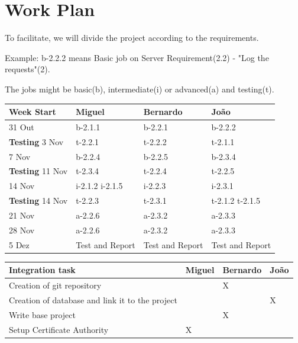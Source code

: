 \documentclass[a4paper,titlepage,11pt]{article}
\begin{document}
\section{Work Plan}
To facilitate, we will divide the project according to the requirements.

Example: b-2.2.2 means Basic job on Server Requirement(2.2) - "Log the requests"(2).

The jobs might be basic(b), intermediate(i) or advanced(a) and testing(t).
\begin{center}
    \begin{tabular}{| l || l | l | l |}
    \hline
    \textbf{Week Start} & \textbf{Miguel} & \textbf{Bernardo} & \textbf{João} \\ \hline \hline
    31 Out & b-2.1.1 & b-2.2.1 & b-2.2.2 \\
    \textbf{Testing} 3 Nov& t-2.2.1 & t-2.2.2 & t-2.1.1 \\ \hline
    7 Nov & b-2.2.4 & b-2.2.5 & b-2.3.4 \\
    \textbf{Testing} 11 Nov & t-2.3.4 & t-2.2.4 & t-2.2.5 \\ \hline
    14 Nov & i-2.1.2 i-2.1.5 & i-2.2.3 & i-2.3.1 \\
    \textbf{Testing} 14 Nov & t-2.2.3 & t-2.3.1 & t-2.1.2 t-2.1.5 \\ \hline
    21 Nov & a-2.2.6 & a-2.3.2 & a-2.3.3 \\
    28 Nov & a-2.2.6 & a-2.3.2 & a-2.3.3 \\
    5 Dez & Test and Report & Test and Report & Test and Report \\ \hline

    \end{tabular}
\end{center}

\begin{center}
    \begin{tabular}{|l| l | l | l |}
    \hline
    \textbf{Integration task} & \textbf{Miguel} & \textbf{Bernardo} & \textbf{João} \\ \hline \hline
    Creation of git repository &  & X &  \\ \hline
    Creation of database and link it to the project &  &  & X \\ \hline
    Write base project &  & X &  \\ \hline
    Setup Certificate Authority & X & & \\ \hline
    \end{tabular}
\end{center}
\end{document}
